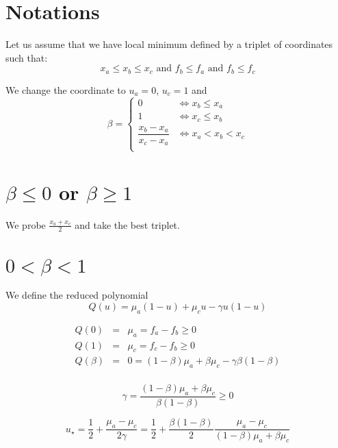 \documentclass[aps,12pt]{revtex4}
\begin{document}
\section{Notations}
Let us assume that we have local minimum defined by a triplet of coordinates such that:
\begin{equation}
	x_a \leq x_b \leq x_c \text{ and } f_b \leq f_a \text{ and } f_b \leq f_c
\end{equation}

We change the coordinate to $u_a=0$, $u_c=1$ and
\begin{equation}
	\beta = \left\lbrace
	\begin{array}{cc}
	0 & \iff  x_b\leq x_a\\
	1 & \iff  x_c\leq x_b\\
	\dfrac{x_b-x_a}{x_c-x_a} & \iff x_a < x_b < x_c\\
	\end{array}
	\right.
\end{equation}

 
\section{$\beta\leq0$ or $\beta\geq1$}

We probe $\frac{x_a+x_c}2$ and take the best triplet.

\section{$0<\beta<1$}
We define the reduced polynomial
\begin{equation}
	Q(u) =  \mu_a (1-u) + \mu_c u - \gamma u(1-u)
\end{equation}	 
 
\begin{equation}
\begin{array}{rcl}
	Q(0) & = & \mu_a = f_a - f_b \geq 0\\
	Q(1) & = & \mu_c = f_c - f_b \geq 0\\
	Q(\beta) & = & 0 = (1-\beta)\mu_a + \beta \mu_c - \gamma \beta(1-\beta)\\
\end{array}
\end{equation}	

\begin{equation}
	\gamma = \dfrac{(1-\beta)\mu_a + \beta \mu_c}{\beta(1-\beta)}  \geq 0 
\end{equation}

\begin{equation}
	u_\star = \dfrac{1}{2} + \dfrac{\mu_a-\mu_c}{2\gamma} = \dfrac{1}{2} + \dfrac{\beta(1-\beta)}{2} 
	\dfrac{\mu_a-\mu_c}{(1-\beta)\mu_a + \beta \mu_c}
\end{equation}
\end{document}

